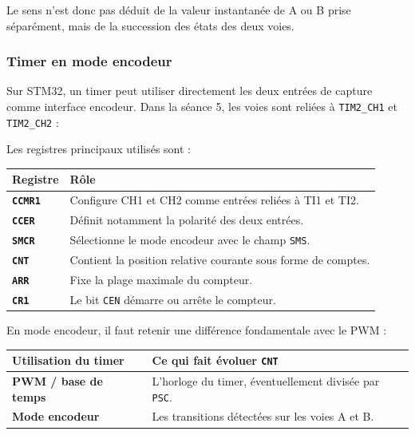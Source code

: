 \documentclass[11pt,a4paper]{article}
\begin{document}
	Le sens n'est donc pas déduit de la valeur instantanée de A ou B prise séparément, mais de la succession des états des deux voies.
	
	\subsubsection*{Timer en mode encodeur}
	
	Sur STM32, un timer peut utiliser directement les deux entrées de capture comme interface encodeur. Dans la séance 5, les voies sont reliées à \texttt{TIM2\_CH1} et \texttt{TIM2\_CH2} :
	
	\begin{center}
	\end{center}
	
	Les registres principaux utilisés sont :
	
	\begin{center}
		\begin{tabular}{>{\bfseries}p{3.5cm}p{9.5cm}}
			\toprule
			Registre & Rôle \\
			\midrule
			\texttt{CCMR1} & Configure CH1 et CH2 comme entrées reliées à TI1 et TI2. \\
			\texttt{CCER} & Définit notamment la polarité des deux entrées. \\
			\texttt{SMCR} & Sélectionne le mode encodeur avec le champ \texttt{SMS}. \\
			\texttt{CNT} & Contient la position relative courante sous forme de comptes. \\
			\texttt{ARR} & Fixe la plage maximale du compteur. \\
			\texttt{CR1} & Le bit \texttt{CEN} démarre ou arrête le compteur. \\
			\bottomrule
		\end{tabular}
	\end{center}
	
	En mode encodeur, il faut retenir une différence fondamentale avec le PWM :
	
	\begin{center}
		\begin{tabular}{>{\bfseries}p{4cm}p{8.5cm}}
			\toprule
			Utilisation du timer & Ce qui fait évoluer \texttt{CNT} \\
			\midrule
			PWM / base de temps & L'horloge du timer, éventuellement divisée par \texttt{PSC}. \\
			Mode encodeur & Les transitions détectées sur les voies A et B. \\
			\bottomrule
		\end{tabular}
	\end{center}
	
\end{document}
